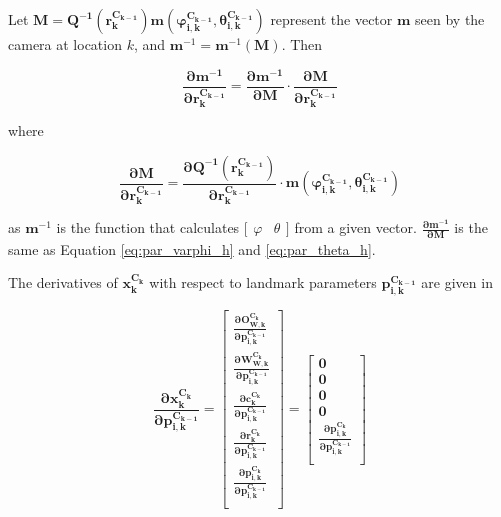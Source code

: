 Let $\boldsymbol{M}=\boldsymbol{Q^{-1}(r_{k}^{C_{k-1}})m(\varphi_{i, k}^{C_{k-1}}, \theta _{i, 
k}^{C_{k-1}})}$ represent the vector $\boldsymbol{m}$ seen by the camera at location
$k$, and $\boldsymbol{m}^{-1}=\boldsymbol{m}^{-1}(\boldsymbol{M})$. Then

\begin{equation}
\boldsymbol{\frac{\partial m^{-1}}{\partial r_{k}^{C_{k-1}}}}=
\boldsymbol{\frac{\partial m^{-1}}{\partial M}\cdot 
\frac{\partial M}{\partial r_{k}^{C_{k-1}}}}
\end{equation}

\noindent where

\begin{equation}
\boldsymbol{\frac{\partial M}{\partial r_{k}^{C_{k-1}}}}= 
\boldsymbol{\frac{\partial Q^{-1}(r_{k}^{C_{k-1}})}{\partial r_{k}^{C_{k-1}}}
\cdot m(\varphi_{i, k}^{C_{k-1}}, \theta_{i, k}^{C_{k-1}})}
\end{equation}


\noindent as $\boldsymbol{m}^{-1}$ is the function that calculates
$\lbrack\begin{matrix}\varphi & \theta \end{matrix}\rbrack$ from a
given vector. $\boldsymbol{\frac{\partial m^{-1}}{\partial M}}$ is the
same as Equation \ref{eq:par_varphi_h} and \ref{eq:par_theta_h}.

The derivatives of $\boldsymbol{x_{k}^{C_{k}}}$ with respect to landmark parameters
$\boldsymbol{p_{i,k}^{C_{k-1}}}$ are given in

\begin{equation}
\boldsymbol{\frac{\partial x_{k}^{C_{k}}}{\partial p_{i,k}^{C_{k-1 }}}}=
\begin{bmatrix}
\boldsymbol{\frac{\partial O_{W,k}^{C_{k}}}{\partial p_{i,k}^{C_{k-1 }}}} \\
\boldsymbol{\frac{\partial W_{W,k}^{C_{k}}}{\partial p_{i,k}^{C_{k-1 }}}} \\
\boldsymbol{\frac{\partial c_{k}^{C_{k}}}{\partial p_{i,k}^{C_{k-1 }}}} \\
\boldsymbol{\frac{\partial r_{k}^{C_{k}}}{\partial p_{i,k}^{C_{k-1 }}}} \\
\boldsymbol{\frac{\partial p_{i, k}^{C_k}}{\partial p_{i,k}^{C_{k-1 }}}} \\
\end{bmatrix} = \begin{bmatrix}
\boldsymbol{0} \\
\boldsymbol{0} \\
\boldsymbol{0} \\
\boldsymbol{0} \\
\boldsymbol{\frac{\partial p_{i,k}^{C_{k }}}{\partial p_{i,k}^{C_{k-1 }}}} \\
\end{bmatrix}
\end{equation}

